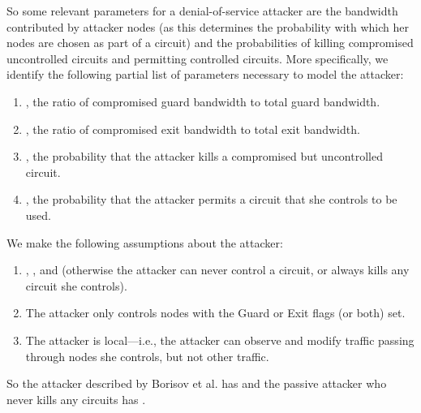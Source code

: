 \documentclass[]{lmcs}
\begin{document}
So some relevant parameters for a denial-of-service attacker are 
the bandwidth contributed by attacker nodes (as this determines the
probability with which her nodes are chosen as part of a circuit)
and the probabilities of killing compromised uncontrolled circuits and 
permitting controlled circuits.
More specifically, we identify the following partial list of
parameters necessary to model the attacker:
\begin{enumerate}
\item , the ratio of compromised guard bandwidth to total
guard bandwidth.
\item , the ratio of compromised exit bandwidth to total
exit bandwidth.
\item , the probability that the attacker kills
a compromised but uncontrolled circuit.
\item , the probability that the attacker permits
a circuit that she controls to be used.
\end{enumerate}
We make the following assumptions about the attacker:
\begin{enumerate}
\item , , and  (otherwise
the attacker can never control a circuit, or always kills any
circuit she controls).
\item The attacker only controls nodes with the Guard or
Exit flags (or both) set.
\item The attacker is local---i.e., the attacker can observe and
modify traffic passing through nodes she controls, but not other
traffic.
\end{enumerate}
So the attacker described by Borisov et al. has
 and the passive
attacker who never kills any circuits
has .
\end{document}
